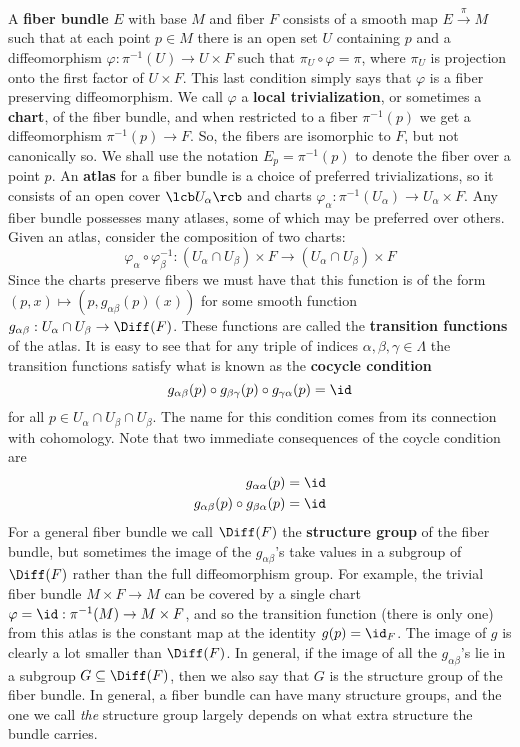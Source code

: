 A \textbf{fiber bundle} $E$ with base $M$ and fiber $F$ consists of a smooth map $E \stackrel{\pi}{\rightarrow} M$ such that at each point $p \in M$ there is an open set $U$ containing $p$ and a diffeomorphism $\varphi : \pi^{-1}(U) \rightarrow U \times F$ such that $\pi_U \circ \varphi = \pi$, where $\pi_U$ is projection onto the first factor of $U \times F$. This last condition simply says that $\varphi$ is a fiber preserving diffeomorphism. We call $\varphi$ a \textbf{local trivialization}, or sometimes a \textbf{chart}, of the fiber bundle, and when restricted to a fiber $\pi^{-1}(p)$ we get a diffeomorphism $\pi^{-1}(p) \rightarrow F$. So, the fibers are isomorphic to $F$, but not canonically so. We shall use the notation $E_p = \pi^{-1}(p)$ to denote the fiber over a point $p$. An \textbf{atlas} for a fiber bundle is a choice of preferred trivializations, so it consists of an open cover $\lcb U_\alpha \rcb$ and charts $\varphi_\alpha : \pi^{-1}(U_\alpha) \rightarrow U_\alpha \times F$. Any fiber bundle possesses many atlases, some of which may be preferred over others. Given an atlas, consider the composition of two charts:
\[ \varphi_\alpha \circ \varphi_\beta^{-1} : (U_\alpha \cap U_\beta) \times F \rightarrow (U_\alpha \cap U_\beta) \times F \]
Since the charts preserve fibers we must have that this function is of the form $(p,x) \mapsto (p,g_{\alpha\beta}(p)(x))$ for some smooth function $g_{\alpha\beta} : U_\alpha \cap U_\beta \rightarrow \Diff(F)$. These functions are called the \textbf{transition functions} of the atlas. It is easy to see that for any triple of indices $\alpha,\beta,\gamma \in \Lambda$ the transition functions satisfy what is known as the \textbf{cocycle condition}
\begin{equation}
\label{cocycle condition}
g_{\alpha\beta}(p) \circ g_{\beta\gamma}(p) \circ g_{\gamma\alpha}(p) = \id
\end{equation}
for all $p \in U_\alpha \cap U_\beta \cap U_\beta$. The name for this condition comes from its connection with \Cech cohomology. Note that two immediate consequences of the coycle condition are
\begin{align}
	g_{\alpha\alpha}(p) &= \id \\
	g_{\alpha\beta}(p) \circ g_{\beta\alpha}(p) &= \id
\end{align}
For a general fiber bundle we call $\Diff(F)$ the \textbf{structure group} of the fiber bundle, but sometimes the image of the $g_{\alpha\beta}$'s take values in a subgroup of $\Diff(F)$ rather than the full diffeomorphism group. For example, the trivial fiber bundle $M \times F \rightarrow M$ can be covered by a single chart $\varphi = \id : \pi^{-1}(M) \rightarrow M \times F$, and so the transition function (there is only one) from this atlas is the constant map at the identity $g(p) = \id_F$. The image of $g$ is clearly a lot smaller than $\Diff(F)$. In general, if the image of all the $g_{\alpha\beta}$'s lie in a subgroup $G \subseteq \Diff(F)$, then we also say that $G$ is the structure group of the fiber bundle. In general, a fiber bundle can have many structure groups, and the one we call \emph{the} structure group largely depends on what extra structure the bundle carries.


